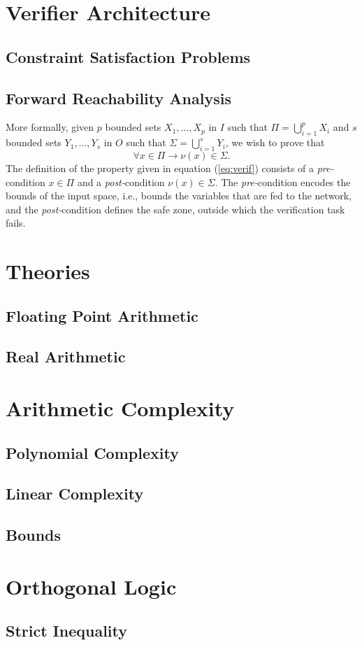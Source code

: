 \section{Verifier Architecture}\label{sec:arch}

\subsection*{Constraint Satisfaction Problems}\label{sec:csp}

\subsection*{Forward Reachability Analysis}\label{sec:fra}

More formally, given $p$ bounded sets $X_1, \ldots, X_p$ in $I$ 
such that $\Pi = \bigcup_{i=1}^p X_i$ and $s$ bounded sets $Y_1, 
\ldots, Y_s$ in $O$ such that $\Sigma = \bigcup_{i=1}^s Y_i$, we wish
to prove that  
\begin{equation}
	\label{eq:verif}
	\forall x \in \Pi \rightarrow \nu(x) \in \Sigma.
\end{equation}
The definition of the property given in equation (\ref{eq:verif})
consists of a \textit{pre-}condition $x \in \Pi$ and a 
\textit{post-}condition $\nu(x) \in \Sigma$. The 
\textit{pre-}condition encodes the bounds of the input space, i.e.,
bounds the variables that are fed to the network, and the 
\textit{post-}condition defines the safe zone, outside which the 
verification task fails.

\section{Theories}

\subsection*{Floating Point Arithmetic}

\subsection*{Real Arithmetic}

\section{Arithmetic Complexity}

\subsection*{Polynomial Complexity}

\subsection*{Linear Complexity}

\subsection*{Bounds}

\section{Orthogonal Logic}

\subsection*{Strict Inequality}

